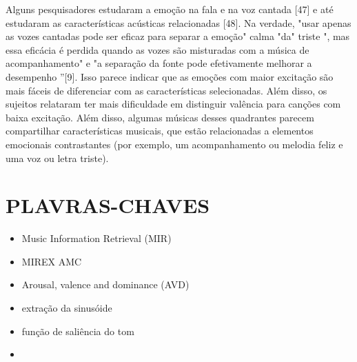 \documentclass{article}
\begin{document}
Alguns pesquisadores estudaram a emoção na fala e na voz cantada [47] e até estudaram as características acústicas relacionadas [48]. Na verdade, "usar apenas as vozes cantadas pode ser eficaz para separar a emoção" calma "da" triste ", mas essa eficácia é perdida quando as vozes são misturadas com a música de acompanhamento" e "a separação da fonte pode efetivamente melhorar a desempenho ”[9].
Isso parece indicar que as emoções com maior excitação são mais fáceis de diferenciar com as características selecionadas.
Além disso, os sujeitos relataram ter mais dificuldade em distinguir valência para canções com baixa excitação. Além disso, algumas músicas desses quadrantes parecem compartilhar características musicais, que estão relacionadas a elementos emocionais contrastantes (por exemplo, um acompanhamento ou melodia feliz e uma voz ou letra triste).


\section{PLAVRAS-CHAVES}
\begin{itemize}
    \item Music Information Retrieval (MIR)
    \item MIREX AMC
    \item Arousal, valence and dominance (AVD)
    \item extração da sinusóide
    \item função de saliência do tom
    \item 
\end{itemize}
\end{document}
